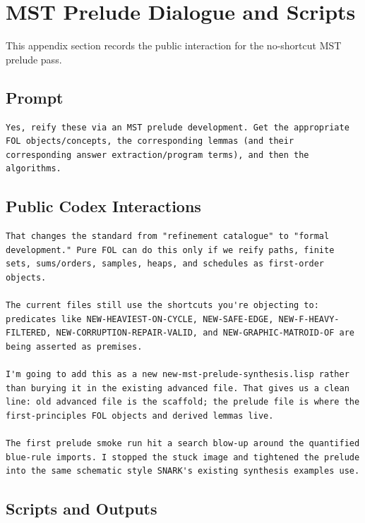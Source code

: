 \documentclass[runningheads]{llncs}
\begin{document}
\section{MST Prelude Dialogue and Scripts}

This appendix section records the public interaction for the no-shortcut MST
prelude pass.

\subsection{Prompt}

\begin{lstlisting}
Yes, reify these via an MST prelude development. Get the appropriate FOL objects/concepts, the corresponding lemmas (and their corresponding answer extraction/program terms), and then the algorithms.
\end{lstlisting}

\subsection{Public Codex Interactions}

\begin{lstlisting}
That changes the standard from "refinement catalogue" to "formal development." Pure FOL can do this only if we reify paths, finite sets, sums/orders, samples, heaps, and schedules as first-order objects.

The current files still use the shortcuts you're objecting to: predicates like NEW-HEAVIEST-ON-CYCLE, NEW-SAFE-EDGE, NEW-F-HEAVY-FILTERED, NEW-CORRUPTION-REPAIR-VALID, and NEW-GRAPHIC-MATROID-OF are being asserted as premises.

I'm going to add this as a new new-mst-prelude-synthesis.lisp rather than burying it in the existing advanced file. That gives us a clean line: old advanced file is the scaffold; the prelude file is where the first-principles FOL objects and derived lemmas live.

The first prelude smoke run hit a search blow-up around the quantified blue-rule imports. I stopped the stuck image and tightened the prelude into the same schematic style SNARK's existing synthesis examples use.
\end{lstlisting}

\subsection{Scripts and Outputs}
\end{document}
